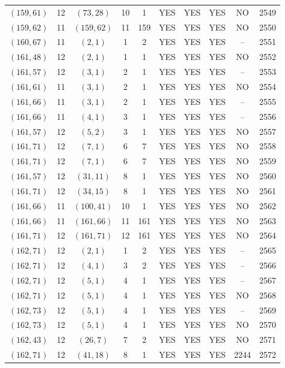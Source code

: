 \begin{longtable}{|c|c|c|c|c|c|c|c|c|c|}
$(159, 61)$ & 12 & $(73, 28)$ & 10 & 1 & YES & YES & YES & NO & 2549\\
$(159, 62)$ & 11 & $(159, 62)$ & 11 & 159 & YES & YES & YES & NO & 2550\\
$(160, 67)$ & 11 & $(2, 1)$ & 1 & 2 & YES & YES & YES & -- & 2551\\
$(161, 48)$ & 12 & $(2, 1)$ & 1 & 1 & YES & YES & YES & NO & 2552\\
$(161, 57)$ & 12 & $(3, 1)$ & 2 & 1 & YES & YES & YES & -- & 2553\\
$(161, 61)$ & 11 & $(3, 1)$ & 2 & 1 & YES & YES & YES & NO & 2554\\
$(161, 66)$ & 11 & $(3, 1)$ & 2 & 1 & YES & YES & YES & -- & 2555\\
$(161, 66)$ & 11 & $(4, 1)$ & 3 & 1 & YES & YES & YES & -- & 2556\\
$(161, 57)$ & 12 & $(5, 2)$ & 3 & 1 & YES & YES & YES & NO & 2557\\
$(161, 71)$ & 12 & $(7, 1)$ & 6 & 7 & YES & YES & YES & NO & 2558\\
$(161, 71)$ & 12 & $(7, 1)$ & 6 & 7 & YES & YES & YES & NO & 2559\\
$(161, 57)$ & 12 & $(31, 11)$ & 8 & 1 & YES & YES & YES & NO & 2560\\
$(161, 71)$ & 12 & $(34, 15)$ & 8 & 1 & YES & YES & YES & NO & 2561\\
$(161, 66)$ & 11 & $(100, 41)$ & 10 & 1 & YES & YES & YES & NO & 2562\\
$(161, 66)$ & 11 & $(161, 66)$ & 11 & 161 & YES & YES & YES & NO & 2563\\
$(161, 71)$ & 12 & $(161, 71)$ & 12 & 161 & YES & YES & YES & NO & 2564\\
$(162, 71)$ & 12 & $(2, 1)$ & 1 & 2 & YES & YES & YES & -- & 2565\\
$(162, 71)$ & 12 & $(4, 1)$ & 3 & 2 & YES & YES & YES & -- & 2566\\
$(162, 71)$ & 12 & $(5, 1)$ & 4 & 1 & YES & YES & YES & -- & 2567\\
$(162, 71)$ & 12 & $(5, 1)$ & 4 & 1 & YES & YES & YES & NO & 2568\\
$(162, 73)$ & 12 & $(5, 1)$ & 4 & 1 & YES & YES & YES & -- & 2569\\
$(162, 73)$ & 12 & $(5, 1)$ & 4 & 1 & YES & YES & YES & NO & 2570\\
$(162, 43)$ & 12 & $(26, 7)$ & 7 & 2 & YES & YES & YES & NO & 2571\\
$(162, 71)$ & 12 & $(41, 18)$ & 8 & 1 & YES & YES & YES & 2244 & 2572\\

\end{longtable}
